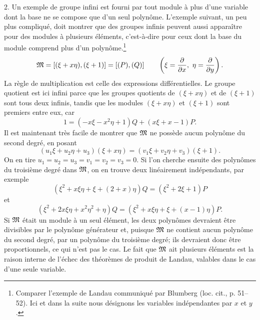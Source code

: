 2. Un exemple de groupe infini est fourni par tout module à plus d'une variable dont la base ne se compose que d'un seul polynôme. L'exemple suivant, un peu plus compliqué, doit montrer que des groupes infinis peuvent aussi apparaître pour des modules à plusieurs éléments, c'est-à-dire pour ceux dont la base du module comprend plus d'un polynôme.\footnote{Comparer l'exemple de Landau communiqué par Blumberg (loc. cit., p. 51--52). Ici et dans la suite nous désignons les variables indépendantes par $x$ et $y$.}
\[
 \mM=[(\xi+x\eta),(\xi+1)]=[(P),(Q)]
 \qquad\left(\xi=\frac{\partial}{\partial x},\ \eta=\frac{\partial}{\partial y}\right).
\]
La règle de multiplication est celle des expressions différentielles. Le groupe quotient est ici infini parce que les groupes quotients de $(\xi+x\eta)$ et de $(\xi+1)$ sont tous deux infinis, tandis que les modules $(\xi+x\eta)$ et $(\xi+1)$ sont premiers entre eux, car
\[
 1=(-x\xi-x^2\eta+1)Q+(x\xi+x-1)P.
\]
Il est maintenant très facile de montrer que $\mathfrak{M}$ ne possède aucun polynôme du second degré, en posant
\[
 (u_1\xi+u_2\eta+u_3)(\xi+x\eta)=(v_1\xi+v_2\eta+v_3)(\xi+1).
\]
On en tire $u_1=u_2=u_3=v_1=v_2=v_3=0$. Si l'on cherche ensuite des polynômes du troisième degré dans $\mathfrak{M}$, on en trouve deux linéairement indépendants, par exemple
\[
 (\xi^2+x\xi\eta+\xi+(2+x)\eta)Q=(\xi^2+2\xi+1)P
\]
et
\[
 (\xi^2+2x\xi\eta+x^2\eta^2+\eta)Q
 =(\xi^2+x\xi\eta+\xi+(x-1)\eta)P.
\]
Si $\mathfrak{M}$ était un module à un seul élément, les deux polynômes devraient être divisibles par le polynôme générateur et, puisque $\mathfrak{M}$ ne contient aucun polynôme du second degré, par un polynôme du troisième degré; ils devraient donc être proportionnels, ce qui n'est pas le cas. Le fait que $\mathfrak{M}$ ait plusieurs éléments est la raison interne de l'échec des théorèmes de produit de Landau, valables dans le cas d'une seule variable.

